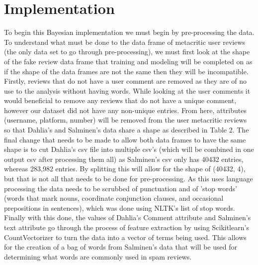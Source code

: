 \documentclass{article}
\begin{document}
\section{Implementation}
\hspace{\parindent} To begin this Bayesian implementation we must begin by pre-processing the data. To understand what must be done to the data frame of metacritic user reviews (the only data set to go through pre-processing), we must first look at the shape of the fake review data frame that training and modeling will be completed on as if the shape of the data frames are not the same then they will be incompatible. Firstly, reviews that do not have a user comment are removed as they are of no use to the analysis without having words. While looking at the user comments it would beneficial to remove any reviews that do not have a unique comment, however our dataset did not have any non-unique entries. From here, attributes (username, platform, number) will be removed from the user metacritic reviews so that Dahlia's and Salminen's data share a shape as described in Table 2. The final change that needs to be made to allow both data frames to have the same shape is to cut Dahlia's csv file into multiple csv's (which will be combined in one output csv after processing them all) as Salminen's csv only has 40432 entries, whereas 283,982 entries. By splitting this will allow for the shape of (40432, 4), but that is not all that needs to be done for pre-processing. As this uses language processing the data needs to be scrubbed of punctuation and of 'stop words' (words that mark nouns, coordinate conjunction clauses, and occasional prepositions in sentences), which was done using NLTK's list of stop words. Finally with this done, the values of Dahlia's Comment attribute and Salminen's text attribute go through the process of feature extraction by using Scikitlearn's CountVectorizer to turn the data into a vector of terms being used. This allows for the creation of a bag of words from Salminen's data that will be used for determining what words are commonly used in spam reviews.\\
\end{document}
